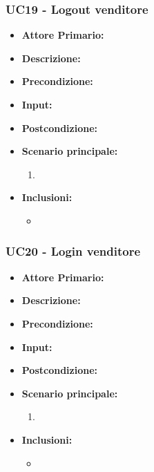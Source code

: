 \subsubsection{UC19 - Logout venditore}
\begin{itemize}
    \item \textbf{Attore Primario:} 
    \item \textbf{Descrizione:}
    \item \textbf{Precondizione:}
    \item \textbf{Input:}
    \item \textbf{Postcondizione:}
    \item \textbf{Scenario principale:}
    \begin{enumerate}
        \item 
    \end{enumerate}
    \item \textbf{Inclusioni:}
    \begin{itemize}
        \item
    \end{itemize}
\end{itemize}
\subsubsection{UC20 - Login venditore}
\begin{itemize}
    \item \textbf{Attore Primario:} 
    \item \textbf{Descrizione:}
    \item \textbf{Precondizione:}
    \item \textbf{Input:}
    \item \textbf{Postcondizione:}
    \item \textbf{Scenario principale:}
    \begin{enumerate}
        \item 
    \end{enumerate}
    \item \textbf{Inclusioni:}
    \begin{itemize}
        \item
    \end{itemize}
\end{itemize}